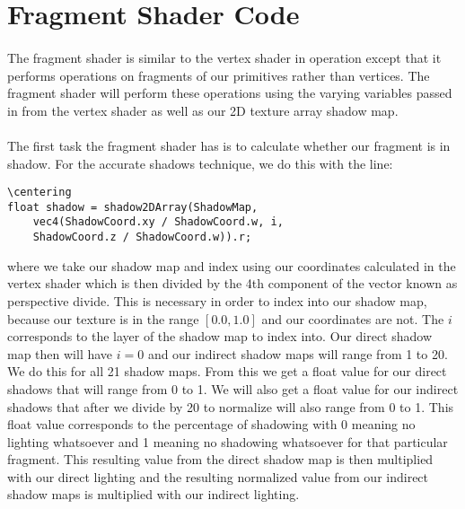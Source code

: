 \section{Fragment Shader Code}\label{sec:fragShader}
\paragraph{}
The fragment shader is similar to the vertex shader in operation except that it performs operations on fragments of our primitives rather than vertices.  The fragment shader will perform these operations using the varying variables passed in from the vertex shader as well as our 2D texture array shadow map.

\paragraph{}
The first task the fragment shader has is to calculate whether our fragment is in shadow.  For the accurate shadows technique, we do this with the line:

\begin{lstlisting}
\centering
float shadow = shadow2DArray(ShadowMap, 
	vec4(ShadowCoord.xy / ShadowCoord.w, i, 
	ShadowCoord.z / ShadowCoord.w)).r;
\end{lstlisting}

where we take our shadow map and index using our coordinates calculated in the vertex shader which is then divided by the 4th component of the vector known as perspective divide.  This is necessary in order to index into our shadow map, because our texture is in the range $[0.0, 1.0]$ and our coordinates are not.  The $i$ corresponds to the layer of the shadow map to index into.  Our direct shadow map then will have $i=0$ and our indirect shadow maps will range from 1 to 20.  We do this for all 21 shadow maps.  From this we get a float value for our direct shadows that will range from 0 to 1.  We will also get a float value for our indirect shadows that after we divide by 20 to normalize will also range from 0 to 1.  This float value corresponds to the percentage of shadowing with 0 meaning no lighting whatsoever and 1 meaning no shadowing whatsoever for that particular fragment.  This resulting value from the direct shadow map is then multiplied with our direct lighting and the resulting normalized value from our indirect shadow maps is multiplied with our indirect lighting.


